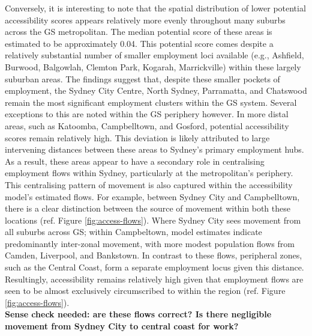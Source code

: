 Conversely, it is interesting to note that the spatial distribution of lower potential accessibility scores appears relatively more evenly throughout many suburbs across the GS metropolitan.  The median potential score of these areas is estimated to be approximately 0.04. This potential score comes despite a relatively substantial number of smaller employment loci available (e.g., Ashfield, Burwood, Balgowlah, Clemton Park, Kogarah, Marrickville) within these largely suburban areas. The findings suggest that, despite these smaller pockets of employment, the Sydney City Centre, North Sydney, Parramatta, and Chatswood remain the most significant employment clusters within the GS system. Several exceptions to this are noted within the GS periphery however. In more distal areas, such as Katoomba, Campbelltown, and Gosford, potential accessibility scores remain relatively high. This deviation is likely attributed to large intervening distances between these areas to Sydney's primary employment hubs. As a result, these areas appear to have a secondary role in centralising employment flows within Sydney, particularly at the metropolitan's periphery. This centralising pattern of movement is also captured within the accessibility model's estimated flows. For example, between Sydney City and Campbelltown, there is a clear distinction between the source of movement within both these locations (ref. Figure \ref{fig:access-flows}). Where Sydney City sees movement from all suburbs across GS; within Campbeltown, model estimates indicate predominantly inter-zonal movement, with more modest population flows from Camden, Liverpool, and Bankstown. In contrast to these flows, peripheral zones, such as the Central Coast, form a separate employment locus given this distance. Resultingly, accessibility remains relatively high given that employment flows are seen to be almost exclusively circumscribed to within the region (ref. Figure \ref{fig:access-flows}). \\

\textbf{Sense check needed: are these flows correct? Is there negligible movement from Sydney City to central coast for work?}


